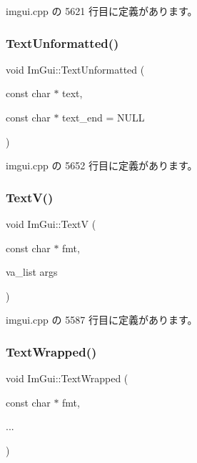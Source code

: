  imgui.\+cpp の 5621 行目に定義があります。

\mbox{\label{namespace_im_gui_a96a5f42789ecc419b2ae8af7b2acc28e}} 
\subsubsection{\texorpdfstring{Text\+Unformatted()}{TextUnformatted()}}
{\footnotesize\ttfamily void Im\+Gui\+::\+Text\+Unformatted (\begin{DoxyParamCaption}\item[{const char $\ast$}]{text,  }\item[{const char $\ast$}]{text\+\_\+end = {\ttfamily NULL} }\end{DoxyParamCaption})}



 imgui.\+cpp の 5652 行目に定義があります。

\mbox{\label{namespace_im_gui_a10a0d6362178c2f743092f21e1b6cd20}} 
\subsubsection{\texorpdfstring{Text\+V()}{TextV()}}
{\footnotesize\ttfamily void Im\+Gui\+::\+TextV (\begin{DoxyParamCaption}\item[{const char $\ast$}]{fmt,  }\item[{va\+\_\+list}]{args }\end{DoxyParamCaption})}



 imgui.\+cpp の 5587 行目に定義があります。

\mbox{\label{namespace_im_gui_ad57bb15c599e73b2ccc7c0f7de6e5823}} 
\subsubsection{\texorpdfstring{Text\+Wrapped()}{TextWrapped()}}
{\footnotesize\ttfamily void Im\+Gui\+::\+Text\+Wrapped (\begin{DoxyParamCaption}\item[{const char $\ast$}]{fmt,  }\item[{}]{... }\end{DoxyParamCaption})}



